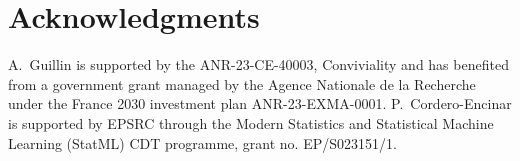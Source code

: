 \documentclass[11pt,reqno]{amsart}
\numberwithin{equation}{section}
\theoremstyle{definition}
\theoremstyle{remark}
\begin{document}
\section*{Acknowledgments}
A.~Guillin is supported by the ANR-23-CE-40003, Conviviality and has benefited from a government grant managed by the Agence Nationale de la Recherche under the France 2030
investment plan ANR-23-EXMA-0001.
P.~Cordero-Encinar is supported by EPSRC through the Modern Statistics and Statistical Machine Learning (StatML) CDT programme, grant no. EP/S023151/1.




\bigskip
\bigskip



\end{document}
